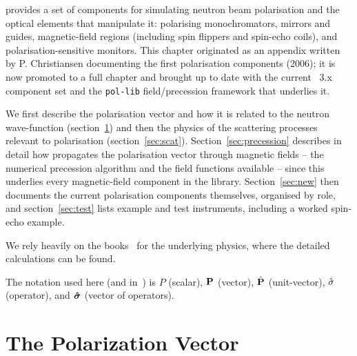 \providecommand{\nup}{n^\uparrow}         %
\providecommand{\nd}{n^\downarrow}        %
\providecommand{\Pu}{P^\uparrow}          %
\providecommand{\Pd}{P^\downarrow}        %
\providecommand{\chiU}{\chi_\uparrow}     %
\providecommand{\chiD}{\chi_\downarrow}   %
\providecommand{\madsq}{\overline{|F_N(\Q)|^2}}       %
\providecommand{\sqmad}{\left|\overline{F_N(\Q)}\right|^2} %
\providecommand{\bd}{\overline{|B_{ld}|^2}}            %

\MCS provides a set of components for simulating neutron beam polarisation
and the optical elements that manipulate it: polarising monochromators,
mirrors and guides, magnetic-field regions (including spin flippers and
spin-echo coils), and polarisation-sensitive monitors. This chapter
originated as an appendix written by P. Christiansen documenting the first
polarisation components (2006); it is now promoted to a full chapter and
brought up to date with the current \MCS~3.x component set and the
\texttt{pol-lib} field/precession framework that underlies it.

We first describe the polarisation vector and how it is related to the
neutron wave-function (section~\ref{sec:pol}) and then the physics of the
scattering processes relevant to polarisation (section~\ref{sec:scat}).
Section~\ref{sec:precession} describes in detail how \MCS propagates the
polarisation vector through magnetic fields -- the numerical precession
algorithm and the field functions available -- since this underlies every
magnetic-field component in the library. Section~\ref{sec:new} then
documents the current polarisation components themselves, organised by
role, and section~\ref{sec:test} lists example and test instruments,
including a worked spin-echo example.

We rely heavily on the books~\cite{lovesey84,gavin} for the underlying
physics, where the detailed calculations can be found.

The notation used here (and in~\cite{gavin}) is $P$ (scalar), $\mathbf{P}$
(vector), $\hat{\mathbf{P}}$ (unit-vector), $\hat\sigma$ (operator), and $\boldsymbol{\hat\sigma}$
(vector of operators).

\section{The Polarization Vector}
\label{sec:pol}

